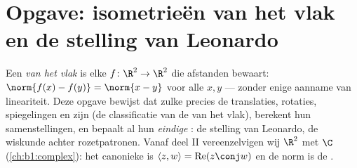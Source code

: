 \section{Opgave: isometrieën van het vlak en de stelling van
Leonardo}

\begin{problem}\label{pb:b1:euclid:1}
Een \emph{ van het vlak} is elke  $f \colon
\R^2 \to \R^2$ die afstanden bewaart: $\norm{f(x) - f(y)} =
\norm{x - y}$ voor alle $x, y$ --- zonder enige aanname van
lineariteit. Deze opgave bewijst dat zulke  precies de
translaties, rotaties, spiegelingen en  zijn (de
classificatie van de  van het vlak), berekent hun
samenstellingen, en bepaalt al hun \emph{eindige} : de
stelling van Leonardo, de wiskunde achter rozetpatronen. Vanaf deel
II vereenzelvigen wij $\R^2$ met $\C$ (\cref{ch:b1:complex}): het
canonieke  is $\langle z, w\rangle =
\operatorname{Re}(z\conj w)$ en de norm is de
.


\end{problem}

